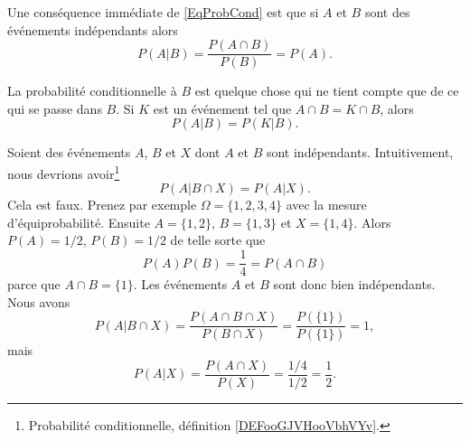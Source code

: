 Une conséquence immédiate de \eqref{EqProbCond} est que si \( A\) et \( B\) sont des événements indépendants alors
\begin{equation}
	P(A|B)=\frac{ P(A\cap B) }{ P(B) }=P(A).
\end{equation}

La probabilité conditionnelle à \( B\) est quelque chose qui ne tient compte que de ce qui se passe dans \( B\). Si \( K\) est un événement tel que \( A\cap B=K\cap B\), alors
\begin{equation}    \label{EqOVHCWom}
	P(A|B)=P(K|B).
\end{equation}


\begin{example}       \label{EXooIAYTooFjFTrT}
	Soient des événements \( A\), \( B\) et \( X\) dont \( A\) et \( B\) sont indépendants. Intuitivement, nous devrions avoir\footnote{Probabilité conditionnelle, définition \ref{DEFooGJVHooVbhVYv}.}
	\begin{equation}
		P(A|B\cap X)=P(A|X).
	\end{equation}
	Cela est faux. Prenez par exemple \( \Omega=\{ 1,2,3,4 \}\) avec la mesure d'équiprobabilité. Ensuite \( A=\{ 1,2 \}\), \( B=\{ 1,3 \}\) et \( X=\{ 1,4 \}\). Alors \( P(A)=1/2\), \( P(B)=1/2\) de telle sorte que
	\begin{equation}
		P(A)P(B)=\frac{1}{ 4 }=P(A\cap B)
	\end{equation}
	parce que \( A\cap B=\{ 1 \}\). Les événements \( A\) et \( B\) sont donc bien indépendants. Nous avons
	\begin{equation}
		P(A|B\cap X)=\frac{ P(A\cap B\cap X) }{ P(B\cap X) }=\frac{ P(\{ 1 \}) }{ P(\{ 1 \})  }=1,
	\end{equation}
	mais
	\begin{equation}
		P(A|X)=\frac{ P(A\cap X) }{ P(X) }=\frac{ 1/4 }{ 1/2 }=\frac{1}{ 2 }.
	\end{equation}
\end{example}


